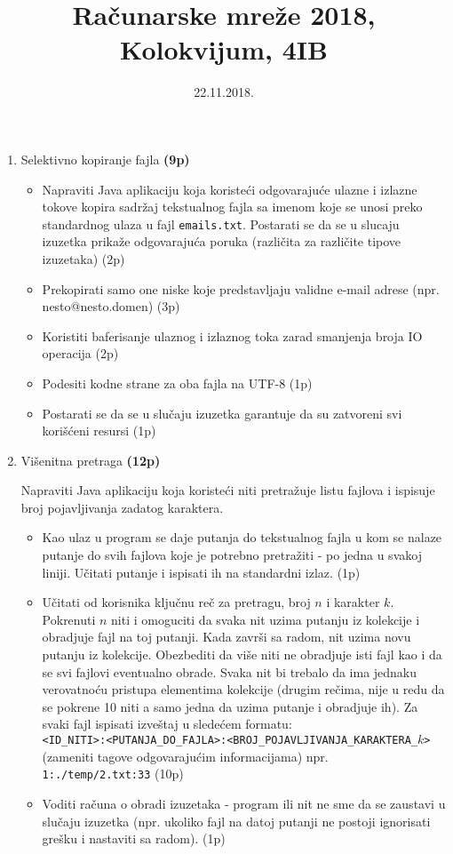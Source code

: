 \documentclass[]{article}
\title{Ra\v{c}unarske mre\v{z}e 2018, Kolokvijum, 4IB}
\author{}
\date{22.11.2018.}
\begin{document}
\maketitle

\begin{enumerate}
  \item Selektivno kopiranje fajla \textbf{(9p)}
  \begin{itemize}
    \item Napraviti Java aplikaciju koja koriste\'c{}i odgovaraju\'c{}e ulazne i izlazne tokove kopira sadr\v{z}aj tekstualnog fajla sa imenom koje se unosi preko standardnog ulaza u fajl \texttt{emails.txt}. Postarati se da se u slucaju izuzetka prika\v{z}e odgovaraju\'c{}a poruka (razli\v{c}ita za razli\v{c}ite tipove izuzetaka) \hfill (2p)
    \item Prekopirati samo one niske koje predstavljaju validne e-mail adrese (npr. nesto@nesto.domen) \hfill (3p)
    \item Koristiti baferisanje ulaznog i izlaznog toka zarad smanjenja broja IO operacija \hfill (2p)
    \item Podesiti kodne strane za oba fajla na UTF-8 \hfill (1p)
    \item Postarati se da se u slu\v{c}aju izuzetka garantuje da su zatvoreni svi kori\v{s}\'c{}eni resursi \hfill (1p)
  \end{itemize}

  \item Vi\v{s}enitna pretraga \textbf{(12p)}

  Napraviti Java aplikaciju koja koriste\'c{}i niti pretra\v{z}uje listu fajlova i ispisuje broj pojavljivanja zadatog karaktera.
  \begin{itemize}
    \item Kao ulaz u program se daje putanja do tekstualnog fajla u kom se nalaze putanje do svih fajlova koje je potrebno pretra\v{z}iti - po jedna u svakoj liniji. U\v{c}itati putanje i ispisati ih na standardni izlaz. \hfill (1p)
    \item U\v{c}itati od korisnika klju\v{c}nu re\v{c} za pretragu, broj $n$ i karakter $k$. Pokrenuti $n$ niti i omoguciti da svaka nit uzima putanju iz kolekcije i obradjuje fajl na toj putanji. Kada zavr\v{s}i sa radom, nit uzima novu putanju iz kolekcije. Obezbediti da vi\v{s}e niti ne obradjuje isti fajl kao i da se svi fajlovi eventualno obrade. Svaka nit bi trebalo da ima jednaku verovatno\'c{}u pristupa elementima kolekcije (drugim re\v{c}ima, nije u redu da se pokrene 10 niti a samo jedna da uzima putanje i obradjuje ih). Za svaki fajl ispisati izve\v{s}taj u slede\'c{}em formatu:\\
    \texttt{<ID\_NITI>:<PUTANJA\_DO\_FAJLA>:<BROJ\_POJAVLJIVANJA\_KARAKTERA\_$k$>} (zameniti tagove odgovaraju\'c{}im informacijama) npr.\\
    \texttt{1:./temp/2.txt:33} \hfill (10p)
    \item Voditi ra\v{c}una o obradi izuzetaka - program ili nit ne sme da se zaustavi u slu\v{c}aju izuzetka (npr. ukoliko fajl na datoj putanji ne postoji ignorisati gre\v{s}ku i nastaviti sa radom). \hfill (1p)
  \end{itemize}


\end{enumerate}
\end{document}
